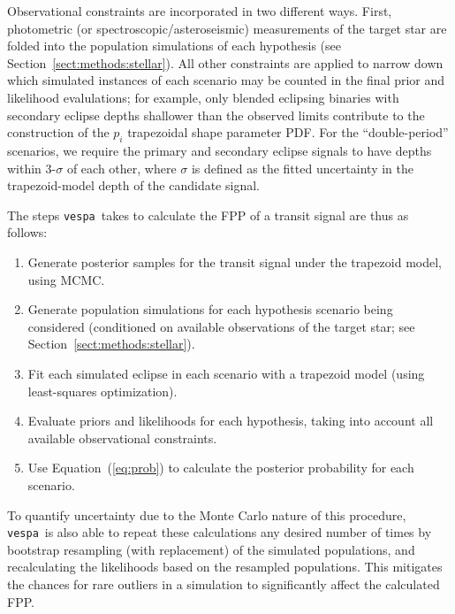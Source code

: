 \documentclass{emulateapj}
\newcommand{\Eq}[1]{Equation~(\ref{eq:#1})}
\newcommand{\eq}[1]{\Eq{#1}}
\newcommand{\sectionname}{Section}
\newcommand{\Sect}[1]{\sectionname~\ref{sect:#1}}
\newcommand{\sect}[1]{\Sect{#1}}
\newcommand{\vespa}{\texttt{vespa}}
\begin{document}
Observational constraints are incorporated in two different ways.
First, photometric (or spectroscopic/asteroseismic) measurements of
the target star are folded into the population simulations of each
hypothesis (see \sect{methods:stellar}).  All other constraints are
applied to narrow down which simulated instances of each scenario may
be counted in the final prior and likelihood evalulations; for
example, only blended eclipsing binaries with secondary eclipse depths
shallower than the observed limits contribute to the construction of
the $p_i$ trapezoidal shape parameter PDF.  For the ``double-period''
scenarios, we require the primary and secondary eclipse signals to
have depths within 3-$\sigma$ of each other, where $\sigma$ is defined
as the fitted uncertainty in the trapezoid-model depth of the
candidate signal.

The steps \vespa\ takes to calculate the FPP of a transit signal
are thus as follows:
\begin{enumerate}
\item Generate posterior samples for the transit signal under the
  trapezoid model, using MCMC.
\item Generate population simulations for each hypothesis scenario
  being considered (conditioned on available observations of the
  target star; see \sect{methods:stellar}).
\item Fit each simulated eclipse in each scenario with a trapezoid
  model (using least-squares optimization).
\item Evaluate priors and likelihoods for each hypothesis, taking into
  account all available observational constraints.
\item Use \eq{prob} to calculate the posterior probability for each scenario.
\end{enumerate}

To quantify uncertainty due to the Monte Carlo nature of this procedure, 
\vespa\ is also able to repeat these calculations any desired number of times 
by bootstrap resampling (with replacement) of the simulated populations, 
and recalculating the likelihoods based on the resampled populations.  
This mitigates the chances for rare outliers in a simulation to significantly 
affect the calculated FPP.
\end{document}
